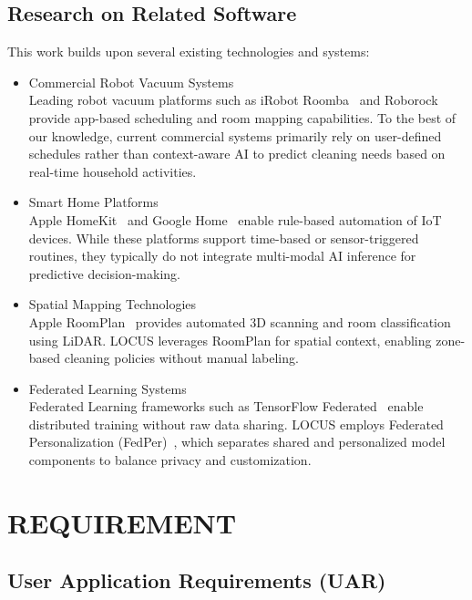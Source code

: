 \documentclass[conference]{IEEEtran}
\begin{document}
\subsection{Research on Related Software}

This work builds upon several existing technologies and systems:

\begin{itemize}
\item [1)] Commercial Robot Vacuum Systems \\
Leading robot vacuum platforms such as iRobot Roomba~\cite{irobot_roomba} and Roborock~\cite{roborock} provide app-based scheduling and room mapping capabilities. To the best of our knowledge, current commercial systems primarily rely on user-defined schedules rather than context-aware AI to predict cleaning needs based on real-time household activities.

\item [2)] Smart Home Platforms \\
Apple HomeKit~\cite{apple_homekit} and Google Home~\cite{google_home} enable rule-based automation of IoT devices. While these platforms support time-based or sensor-triggered routines, they typically do not integrate multi-modal AI inference for predictive decision-making.

\item [3)] Spatial Mapping Technologies \\
Apple RoomPlan~\cite{apple_roomplan} provides automated 3D scanning and room classification using LiDAR. LOCUS leverages RoomPlan for spatial context, enabling zone-based cleaning policies without manual labeling.

\item [4)] Federated Learning Systems \\
Federated Learning frameworks such as TensorFlow Federated~\cite{bonawitz2019tensorflow} enable distributed training without raw data sharing. LOCUS employs Federated Personalization (FedPer)~\cite{arivazhagan2019federated}, which separates shared and personalized model components to balance privacy and customization.
\end{itemize}


\section{REQUIREMENT}

\subsection{User Application Requirements (UAR)}
\end{document}
